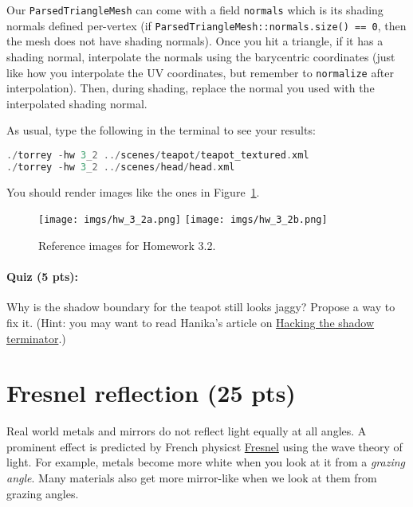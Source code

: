 Our \lstinline{ParsedTriangleMesh} can come with a field \lstinline{normals} which is its shading normals defined per-vertex (if \lstinline{ParsedTriangleMesh::normals.size() == 0}, then the mesh does not have shading normals). Once you hit a triangle, if it has a shading normal, interpolate the normals using the barycentric coordinates (just like how you interpolate the UV coordinates, but remember to \lstinline{normalize} after interpolation). Then, during shading, replace the normal you used with the interpolated shading normal.

As usual, type the following in the terminal to see your results:
\begin{lstlisting}[language=C++]
./torrey -hw 3_2 ../scenes/teapot/teapot_textured.xml
./torrey -hw 3_2 ../scenes/head/head.xml
\end{lstlisting}
You should render images like the ones in Figure~\ref{fig:hw_3_2}.

\begin{figure}[ht]
    \centering
    \texttt{[image: imgs/hw\_3\_2a.png]}
    \texttt{[image: imgs/hw\_3\_2b.png]}
    \caption{Reference images for Homework 3.2.}
    \label{fig:hw_3_2}
\end{figure}

\paragraph{Quiz (5 pts):} Why is the shadow boundary for the teapot still looks jaggy? Propose a way to fix it. (Hint: you may want to read Hanika's article on \href{https://jo.dreggn.org/home/2021_terminator.pdf}{Hacking the shadow terminator}.)

\section{Fresnel reflection (25 pts)}
Real world metals and mirrors do not reflect light equally at all angles. A prominent effect is predicted by French physicst \href{https://en.wikipedia.org/wiki/Augustin-Jean_Fresnel}{Fresnel} using the wave theory of light. For example, metals become more white when you look at it from a \emph{grazing angle}. Many materials also get more mirror-like when we look at them from grazing angles.

